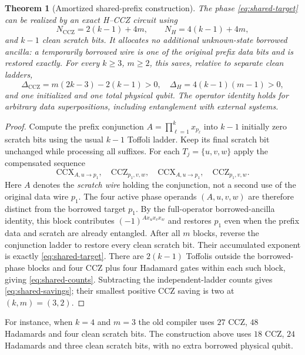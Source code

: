\documentclass[11pt,a4paper]{article}
\newtheorem{theorem}{Theorem}
\begin{document}
\begin{theorem}[Amortized shared-prefix construction]
\label{thm:shared-prefix}
The phase \eqref{eq:shared-target} can be realized
by an exact H--CCZ circuit using
\begin{equation}\label{eq:shared-counts}
N_{\mathrm{CCZ}}=2(k-1)+4m,\qquad
N_H=4(k-1)+4m,
\end{equation}
and $k-1$ clean scratch bits.
It allocates \emph{no} additional
unknown-state borrowed ancilla:
a temporarily borrowed wire is one
of the original prefix \emph{data} bits
and is restored exactly.
For every $k\ge3$, $m\ge2$, this
saves, relative to separate clean ladders,
\begin{equation}\label{eq:shared-savings}
\Delta_{\mathrm{CCZ}}
=m(2k-3)-2(k-1)>0,\quad
\Delta_H=4(k-1)(m-1)>0,
\end{equation}
and one initialized and one total physical qubit.
The operator identity holds for arbitrary data
superpositions, including entanglement with
external systems.
\end{theorem}
\begin{proof}
Compute the prefix conjunction
$A=\prod_{\ell=1}^{k}x_{p_\ell}$
into $k-1$ initially zero scratch bits
using the usual $k-1$ Toffoli ladder.
Keep its final scratch bit unchanged
while processing all suffixes.
For each $T_j=\{u,v,w\}$ apply the
compensated sequence
\[
\mathrm{CCX}_{A,u\to p_1},\quad
\mathrm{CCZ}_{p_1,v,w},\quad
\mathrm{CCX}_{A,u\to p_1},\quad
\mathrm{CCZ}_{p_1,v,w}.
\]
Here $A$ denotes the \emph{scratch wire}
holding the conjunction, not a second
use of the original data wire $p_1$.
The four active phase operands
$(A,u,v,w)$ are therefore distinct
from the borrowed target $p_1$.
By the full-operator borrowed-ancilla
identity, this block contributes
$(-1)^{Ax_ux_vx_w}$ and restores $p_1$
even when the prefix data and scratch
are already entangled. After all
$m$ blocks, reverse the conjunction
ladder to restore every clean scratch
bit. Their accumulated exponent
is exactly \eqref{eq:shared-target}.
There are $2(k-1)$ Toffolis outside
the borrowed-phase blocks and four
CCZ plus four Hadamard gates within
each such block, giving
\eqref{eq:shared-counts}.
Subtracting the independent-ladder
counts gives \eqref{eq:shared-savings};
their smallest positive CCZ saving is
two at $(k,m)=(3,2)$.
\end{proof}
For instance, when $k=4$ and $m=3$
the old compiler uses $27$ CCZ,
$48$ Hadamards and four clean scratch
bits. The construction above uses
$18$ CCZ, $24$ Hadamards and three
clean scratch bits, with no extra
borrowed physical qubit.
\end{document}
